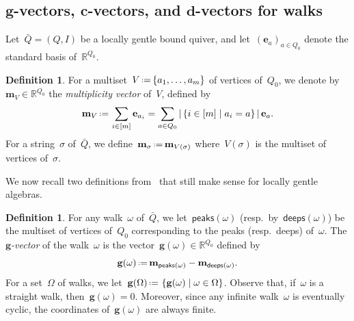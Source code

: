 \documentclass{amsart}
\theoremstyle{definition}
\newtheorem{definition}[theorem]{Definition}
\newcommand{\R}{\mathbb{R}} %
\renewcommand{\b}[1]{\mathbf{#1}} %
\newcommand{\set}[2]{\left\{ #1 \;\middle|\; #2 \right\}} %
\newcommand{\eqdef}{\mbox{\,\raisebox{0.2ex}{\scriptsize\ensuremath{\mathrm:}}\ensuremath{=}\,}} %
\newcommand{\darkblue}{\color{darkblue}} %
\newcommand{\defn}[1]{\textsl{\darkblue #1}} %
\newcommand{\peaks}[1]{\mathsf{peaks}(#1)} %
\newcommand{\deeps}[1]{\mathsf{deeps}(#1)} %
\newcommand{\gvector}[1]{\mathbf{g}(#1)} %
\newcommand{\gvectors}[1]{\mathbf{g}(#1)} %
\newcommand{\multiplicityVector}{\b{m}} %
\begin{document}
\subsection{$\b{g}$-vectors, $\b{c}$-vectors, and $\b{d}$-vectors for walks}
\label{subsec:gcdVectorsWalks}

Let~$\bar Q = (Q,I)$ be a locally gentle bound quiver, and let~$(\b{e}_a)_{a \in Q_0}$ denote the standard basis of~$\R^{Q_0}$.

\begin{definition}
For a multiset~$V \eqdef \{a_1, \dots, a_m\}$ of vertices of~$Q_0$, we denote by~$\multiplicityVector_V \in \R^{Q_0}$ the \defn{multiplicity vector} of~$V$, defined by
\[
\multiplicityVector_V \eqdef \sum_{i \in [m]} \b{e}_{a_i} = \sum_{a \in Q_0} |\set{i \in [m]}{a_i = a}| \, \b{e}_a.
\]
For a string~$\sigma$ of~$\bar Q$, we define~$\multiplicityVector_\sigma \eqdef \multiplicityVector_{V(\sigma)}$ where~$V(\sigma)$ is the multiset of vertices of~$\sigma$. 
\end{definition}

We now recall two definitions from~\cite{PaluPilaudPlamondon} that still make sense for locally gentle algebras.

\begin{definition}
\label{def:gVectorsWalks}
For any walk~$\omega$ of~$\bar Q$, we let~$\peaks{\omega}$ (resp.~by~$\deeps{\omega}$) be the multiset of vertices of~$Q_0$ corresponding to the peaks (resp.~deeps) of~$\omega$.
The \defn{$\b{g}$-vector} of the walk~$\omega$ is the vector~${\gvector{\omega} \in \R^{Q_0}}$ defined by
\[
\gvector{\omega} \eqdef \multiplicityVector_{\peaks{\omega}} - \multiplicityVector_{\deeps{\omega}}.
\]
For a set~$\Omega$ of walks, we let~$\gvectors{\Omega} \eqdef \set{\gvector{\omega}}{\omega \in \Omega}$.
Observe that, if~$\omega$ is a straight walk, then~$\gvector{\omega} = 0$. Moreover, since any infinite walk~$\omega$ is eventually cyclic, the coordinates of~$\gvector{\omega}$ are always finite.
\end{definition}
\end{document}
